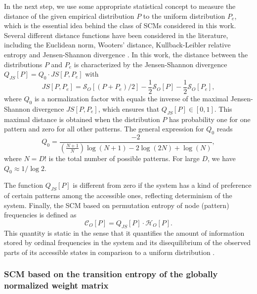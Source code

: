 \documentclass[12pt,aip,cha,reprint,nofootinbib]{revtex4-1}
\begin{document}
In the next step, we use some appropriate statistical concept to measure the distance of the given empirical distribution $P$ to the uniform distribution $P_e$, which is the essential idea behind the class of SCMs considered in this work. Several different distance functions have been considered in the literature, including the Euclidean norm, Wooters' distance, Kullback-Leibler relative entropy and Jensen-Shannon divergence \cite{kowalskiEntropy2011}. In this work, the distance between the distributions $P$ and $P_e$ is characterized by the Jensen-Shannon divergence $Q_{JS}[P] = Q_0 \cdot JS[P, P_e]$ with 
\begin{equation}
JS[P, P_e] = \mathcal{S}_O[(P+P_e)/2] - \frac{1}{2}\mathcal{S}_O[P] - \frac{1}{2}\mathcal{S}_O[P_e], 
\end{equation}
where $Q_0$ is a normalization factor with equals the inverse of the maximal Jensen-Shannon divergence $JS[P, P_e]$, which ensures that $Q_{JS}[P] \in [0, 1]$. This maximal distance is obtained when the distribution $P$ has probability one for one pattern and zero for all other patterns. The general expression for $Q_0$ reads  
\begin{equation} \label{eq:Q0}
Q_0 = \frac{-2}{\left(\frac{N+1}{N}\right) \log (N+1) -2 \log (2N) + \log (N)},
\end{equation}
where $N = D!$ is the total number of possible patterns. For large $D$, we have $Q_0 \approx 1 /  \log 2$. 

The function $Q_{JS}[P]$ is different from zero if the system has a kind of preference of certain patterns among the accessible ones, reflecting determinism of the system. Finally, the SCM based on permutation entropy of node (pattern) frequencies is defined as 
\begin{equation}
\mathcal{C}_{O}[P] = Q_{JS}[P] \cdot \mathcal{H}_{O}[P].
\end{equation}
This quantity is static in the sense that it quantifies the amount of information stored by ordinal frequencies in the system and its disequilibrium of the observed parts of its accessible states in comparison to a uniform distribution \cite{LopezPLA1995}. 

\subsubsection{SCM based on the transition entropy of the globally normalized weight matrix} 
\end{document}
